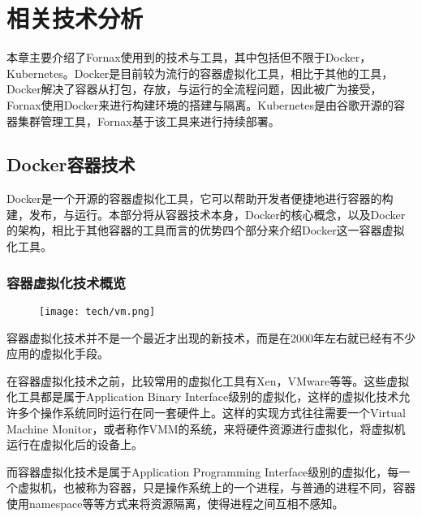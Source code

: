
\chapter{相关技术分析}
\label{chap:tech}

本章主要介绍了Fornax使用到的技术与工具，其中包括但不限于Docker，Kubernetes。Docker是目前较为流行的容器虚拟化工具，相比于其他的工具，Docker解决了容器从打包，存放，与运行的全流程问题，因此被广为接受，Fornax使用Docker来进行构建环境的搭建与隔离。Kubernetes是由谷歌开源的容器集群管理工具，Fornax基于该工具来进行持续部署。

\section{Docker容器技术}

Docker是一个开源的容器虚拟化工具，它可以帮助开发者便捷地进行容器的构建，发布，与运行。本部分将从容器技术本身，Docker的核心概念，以及Docker的架构，相比于其他容器的工具而言的优势四个部分来介绍Docker这一容器虚拟化工具。

\subsection{容器虚拟化技术概览}

\begin{figure}[!htp]
  \centering
  \texttt{[image: tech/vm.png]}
\end{figure}

容器虚拟化技术并不是一个最近才出现的新技术，而是在2000年左右就已经有不少应用的虚拟化手段。

在容器虚拟化技术之前，比较常用的虚拟化工具有Xen，VMware等等。这些虚拟化工具都是属于Application Binary Interface级别的虚拟化，这样的虚拟化技术允许多个操作系统同时运行在同一套硬件上。这样的实现方式往往需要一个Virtual Machine Monitor，或者称作VMM的系统，来将硬件资源进行虚拟化，将虚拟机运行在虚拟化后的设备上。

而容器虚拟化技术是属于Application Programming Interface级别的虚拟化，每一个虚拟机，也被称为容器，只是操作系统上的一个进程，与普通的进程不同，容器使用namespace等等方式来将资源隔离，使得进程之间互相不感知。\cite{soltesz2007container}

